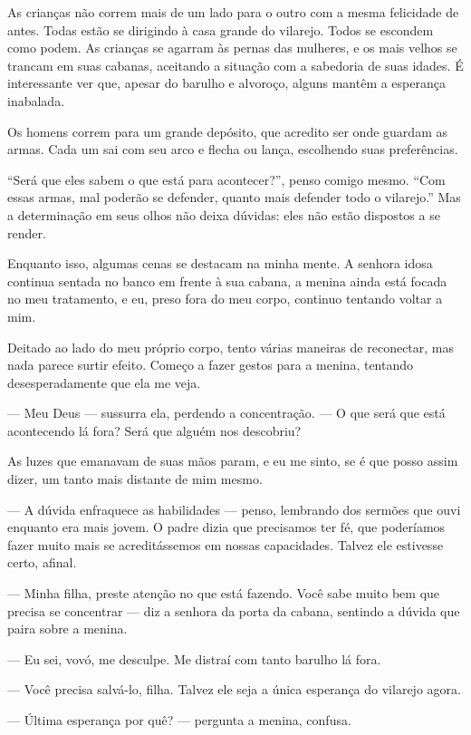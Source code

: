 As crianças não correm mais de um lado para o outro com a mesma felicidade de antes.  
Todas estão se dirigindo à casa grande do vilarejo.  
Todos se escondem como podem.  
As crianças se agarram às pernas das mulheres, e os mais velhos se trancam em suas cabanas, aceitando a situação com a sabedoria de suas idades.  
É interessante ver que, apesar do barulho e alvoroço, alguns mantêm a esperança inabalada.

Os homens correm para um grande depósito, que acredito ser onde guardam as armas.  
Cada um sai com seu arco e flecha ou lança, escolhendo suas preferências.

“Será que eles sabem o que está para acontecer?”, penso comigo mesmo.  
“Com essas armas, mal poderão se defender, quanto mais defender todo o vilarejo.”  
Mas a determinação em seus olhos não deixa dúvidas: eles não estão dispostos a se render.

Enquanto isso, algumas cenas se destacam na minha mente.  
A senhora idosa continua sentada no banco em frente à sua cabana, a menina ainda está focada no meu tratamento, e eu, preso fora do meu corpo, continuo tentando voltar a mim.

Deitado ao lado do meu próprio corpo, tento várias maneiras de reconectar, mas nada parece surtir efeito.  
Começo a fazer gestos para a menina, tentando desesperadamente que ela me veja.

— Meu Deus — sussurra ela, perdendo a concentração. — O que será que está acontecendo lá fora? Será que alguém nos descobriu?

As luzes que emanavam de suas mãos param, e eu me sinto, se é que posso assim dizer, um tanto mais distante de mim mesmo.

— A dúvida enfraquece as habilidades — penso, lembrando dos sermões que ouvi enquanto era mais jovem.  
O padre dizia que precisamos ter fé, que poderíamos fazer muito mais se acreditássemos em nossas capacidades.  
Talvez ele estivesse certo, afinal.

— Minha filha, preste atenção no que está fazendo. Você sabe muito bem que precisa se concentrar — diz a senhora da porta da cabana, sentindo a dúvida que paira sobre a menina.

— Eu sei, vovó, me desculpe. Me distraí com tanto barulho lá fora.

— Você precisa salvá-lo, filha. Talvez ele seja a única esperança do vilarejo agora.

— Última esperança por quê? — pergunta a menina, confusa.

